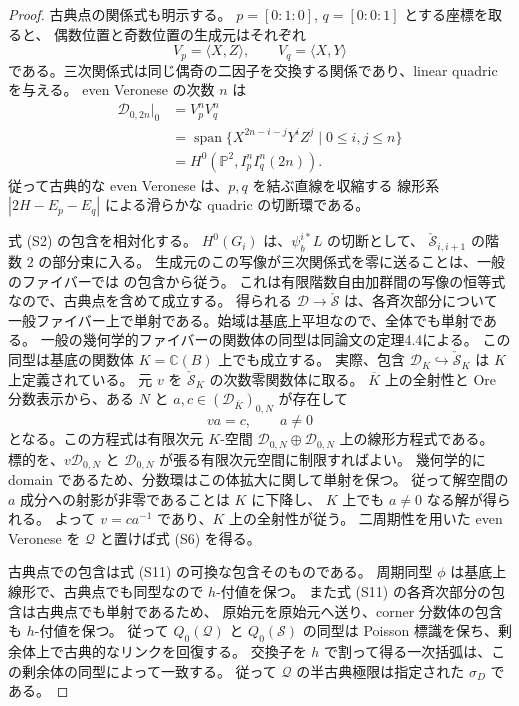 \begin{proof}
古典点の関係式も明示する。
$p=[0:1:0]$, $q=[0:0:1]$ とする座標を取ると、
偶数位置と奇数位置の生成元はそれぞれ
\[
 V_p=\langle X,Z\rangle,\qquad V_q=\langle X,Y\rangle
\]
である。三次関係式は同じ偶奇の二因子を交換する関係であり、linear quadric を与える。
even Veronese の次数 $n$ は
\begin{align*}
 \mathcal D_{0,2n}|_0
 &=V_p^nV_q^n\\
 &=\operatorname{span}\{X^{2n-i-j}Y^iZ^j\mid0\le i,j\le n\}\\
 &=H^0(\mathbb P^2,I_p^nI_q^n(2n)).
 \tag{S11}
\end{align*}
従って古典的な even Veronese は、$p,q$ を結ぶ直線を収縮する
線形系 $|2H-E_p-E_q|$ による滑らかな quadric の切断環である。

式 (S2) の包含を相対化する。
$H^0(G_i)$ は、$\psi_b^{i*}L$ の切断として、
$\check{\mathcal S}_{i,i+1}$ の階数 $2$ の部分束に入る。
生成元のこの写像が三次関係式を零に送ることは、一般のファイバーでは
\cite[\S4.2]{Presotto2018} の包含から従う。
これは有限階数自由加群間の写像の恒等式なので、古典点を含めて成立する。
得られる $\mathcal D\to\check{\mathcal S}$ は、各斉次部分について
一般ファイバー上で単射である。始域は基底上平坦なので、全体でも単射である。
一般の幾何学的ファイバーの関数体の同型は同論文の定理4.4による。
この同型は基底の関数体 $K=\mathbb C(B)$ 上でも成立する。
実際、包含 $\mathcal D_K\hookrightarrow\check{\mathcal S}_K$ は $K$ 上定義されている。
元 $v$ を $\check{\mathcal S}_K$ の次数零関数体に取る。
$\overline K$ 上の全射性と Ore 分数表示から、ある $N$ と
$a,c\in (\mathcal D_{\overline K})_{0,N}$ が存在して
\[
                  va=c,\qquad a\ne0
\]
となる。この方程式は有限次元 $K$-空間
$\mathcal D_{0,N}\oplus\mathcal D_{0,N}$ 上の線形方程式である。
標的を、$v\mathcal D_{0,N}$ と $\mathcal D_{0,N}$ が張る有限次元空間に制限すればよい。
幾何学的に domain であるため、分数環はこの体拡大に関して単射を保つ。
従って解空間の $a$ 成分への射影が非零であることは $K$ に下降し、
$K$ 上でも $a\ne0$ なる解が得られる。
よって $v=ca^{-1}$ であり、$K$ 上の全射性が従う。
二周期性を用いた even Veronese を $\mathcal Q$ と置けば式 (S6) を得る。

古典点での包含は式 (S11) の可換な包含そのものである。
周期同型 $\phi$ は基底上線形で、古典点でも同型なので $h$-付値を保つ。
また式 (S11) の各斉次部分の包含は古典点でも単射であるため、
原始元を原始元へ送り、corner 分数体の包含も $h$-付値を保つ。
従って $Q_0(\mathcal Q)$ と $Q_0(\mathcal S)$ の同型は
Poisson 標識を保ち、剰余体上で古典的なリンクを回復する。
交換子を $h$ で割って得る一次括弧は、この剰余体の同型によって一致する。
従って $\mathcal Q$ の半古典極限は指定された $\sigma_D$ である。
\end{proof}

